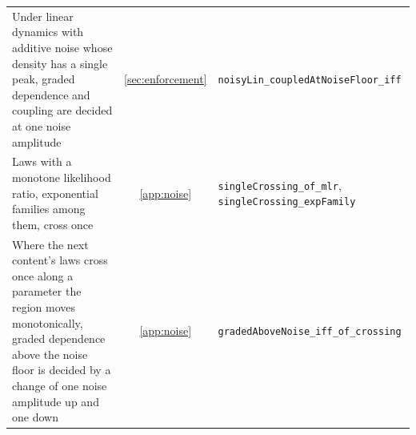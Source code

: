 \documentclass[12pt]{article}
\begin{document}
{\begin{longtable}{>{\raggedright\arraybackslash}p{}c>{\raggedright\arraybackslash}p{}}
Under linear dynamics with additive noise whose density has a single peak, graded dependence and coupling are decided at one noise amplitude & \ref{sec:enforcement} & \texttt{noisyLin\_\allowbreak{}coupledAtNoiseFloor\_\allowbreak{}iff} \\
Laws with a monotone likelihood ratio, exponential families among them, cross once & \ref{app:noise} & \texttt{singleCrossing\_\allowbreak{}of\_\allowbreak{}mlr}, \texttt{singleCrossing\_\allowbreak{}expFamily} \\
Where the next content's laws cross once along a parameter the region moves monotonically, graded dependence above the noise floor is decided by a change of one noise amplitude up and one down & \ref{app:noise} & \texttt{gradedAboveNoise\_\allowbreak{}iff\_\allowbreak{}of\_\allowbreak{}crossing} \\
\hline
\end{longtable}
}
\end{document}

